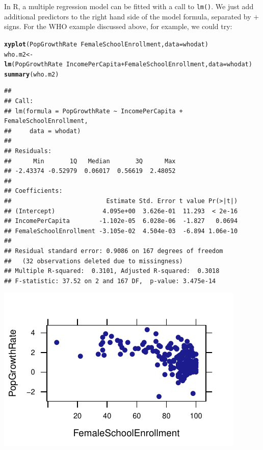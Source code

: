 \documentclass[twoside]{book}\usepackage[]{graphicx}\usepackage[]{xcolor}
\makeatletter
\def\maxwidth{ %
  \ifdim\Gin@nat@width>\linewidth
    \linewidth
  \else
    \Gin@nat@width
  \fi
}
\newcommand{\hlopt}[1]{\textcolor[rgb]{0,0,0}{#1}}%
\newcommand{\hlstd}[1]{\textcolor[rgb]{0.345,0.345,0.345}{#1}}%
\newcommand{\hlkwb}[1]{\textcolor[rgb]{0.69,0.353,0.396}{#1}}%
\newcommand{\hlkwc}[1]{\textcolor[rgb]{0.333,0.667,0.333}{#1}}%
\newcommand{\hlkwd}[1]{\textcolor[rgb]{0.737,0.353,0.396}{\textbf{#1}}}%
\newenvironment{kframe}{%
 \def\at@end@of@kframe{}%
 \ifinner\ifhmode%
  \def\at@end@of@kframe{\end{minipage}}%
  \begin{minipage}{\columnwidth}%
 \fi\fi%
 \def\FrameCommand##1{\hskip\@totalleftmargin \hskip-\fboxsep
 \colorbox{shadecolor}{##1}\hskip-\fboxsep
     \hskip-\linewidth \hskip-\@totalleftmargin \hskip\columnwidth}%
 \MakeFramed {\advance\hsize-\width
   \@totalleftmargin\z@ \linewidth\hsize
   \@setminipage}}%
 {\par\unskip\endMakeFramed%
 \at@end@of@kframe}
\newenvironment{knitrout}{}{} %
\newcounter{example}[section]
\makeatother
\begin{document}
In R, a multiple regression model can be fitted with a call to \texttt{lm()}.  We just add additional predictors to the right hand side of the model formula, separated by $+$ signs. For the WHO example discussed above, for example, we could try:
\begin{knitrout}
\color{fgcolor}\begin{kframe}
\begin{alltt}
\hlkwd{xyplot}\hlstd{(PopGrowthRate}\hlopt{~}\hlstd{FemaleSchoolEnrollment,} \hlkwc{data}\hlstd{=whodat)}
\hlstd{who.m2} \hlkwb{<-} \hlkwd{lm}\hlstd{(PopGrowthRate}\hlopt{~}\hlstd{IncomePerCapita} \hlopt{+} \hlstd{FemaleSchoolEnrollment,} \hlkwc{data}\hlstd{=whodat)}
\hlkwd{summary}\hlstd{(who.m2)}
\end{alltt}
\begin{verbatim}
## 
## Call:
## lm(formula = PopGrowthRate ~ IncomePerCapita + FemaleSchoolEnrollment, 
##     data = whodat)
## 
## Residuals:
##      Min       1Q   Median       3Q      Max 
## -2.43374 -0.52979  0.06017  0.56619  2.48052 
## 
## Coefficients:
##                          Estimate Std. Error t value Pr(>|t|)
## (Intercept)             4.095e+00  3.626e-01  11.293  < 2e-16
## IncomePerCapita        -1.102e-05  6.028e-06  -1.827   0.0694
## FemaleSchoolEnrollment -3.105e-02  4.504e-03  -6.894 1.06e-10
## 
## Residual standard error: 0.9086 on 167 degrees of freedom
##   (32 observations deleted due to missingness)
## Multiple R-squared:  0.3101,	Adjusted R-squared:  0.3018 
## F-statistic: 37.52 on 2 and 167 DF,  p-value: 3.475e-14
\end{verbatim}
\end{kframe}

{\centering \includegraphics[width=\maxwidth]{figures/fig-who_slm2-1} 

}



\end{knitrout}
\end{document}
